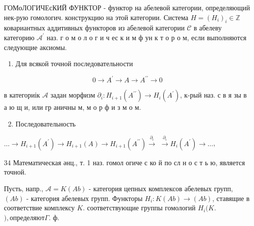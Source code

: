 \documentclass[10pt]{article}
\begin{document}
ГОМоЛОГИЧЕсКИЙ ФУНКТОР - функтор на абелевой категории, определяющий нек-рую гомологич. конструкцию на этой категории. Система $H=\left(H_{i}\right)_{i} \in \mathbb{Z}$ ковариантных аддитивных функторов из абелевой категории $\mathcal{C}$ в абелеву категорию $\mathcal{A}^{\prime}$ наз. г о м о л о г и ч ес к и м ф ун к т о р о м, если выполняются следующие аксиомы.



\begin{enumerate}

  \item Для всякой точной последовательности

\end{enumerate}



\[

0 \rightarrow A^{\prime} \rightarrow A \rightarrow A^{\prime \prime} \rightarrow 0

\]



в категориік $\mathcal{A}$ задан морфизм $\partial_{i}: H_{i+1}\left(A^{\prime \prime}\right) \rightarrow H_{i}\left(A^{\prime}\right)$, к-рый наз. с в я зы в а ю щ и, или гр аничны м, м о р ф и $з$ м о м.



\begin{enumerate}

  \setcounter{enumi}{1}

  \item Последовательность

\end{enumerate}



$\ldots \longrightarrow H_{i+1}\left(A^{\prime}\right) \longrightarrow H_{i+1}(A) \longrightarrow H_{i+1}\left(A^{\prime \prime}\right) \stackrel{\partial_{i}}{\longrightarrow}$ $\stackrel{\partial_{i}}{\longrightarrow} H_{i}\left(A^{\prime}\right) \longrightarrow \ldots$,



34 Математическая әнц., т. 1 наз. гомол огиче с ко й по сл н о с т ь ю, является точной.



Пусть, напр., $\mathcal{A}=K(A b)$ - категория цепных комплексов абелевых групп, $(A b)$ - категория абелевых групп. Функторы $H_{i}: K(A b) \rightarrow(A b)$, ставящие в соответствие комплексу $K$. соответствующие группы гомологий $H_{i}(K$.$) , определяют \Gamma$. ф.
\end{document}
